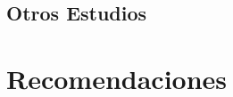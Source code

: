 \documentclass[10pt]{moderncv}
\begin{document}
\subsection{Otros Estudios}

\section{Recomendaciones}
\cvline{}{\small }

\closesection{}                   %
\renewcommand{\listitemsymbol}{-} %



% 
\end{document}

